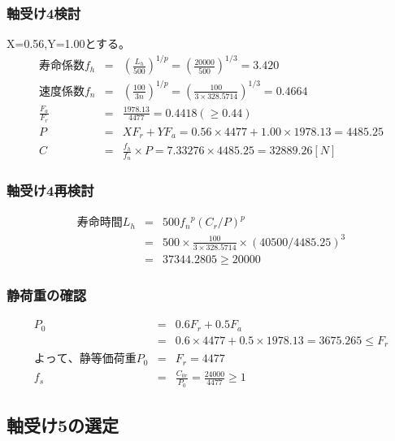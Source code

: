 \documentclass[a4j,twoside,openright,11pt]{jreport}
\begin{document}
\subsubsection{軸受け4検討}
X=0.56,Y=1.00とする。
\begin{eqnarray}
寿命係数f_h &=& \left( \frac{L_h}{500} \right)^{1/p} = \left( \frac{20000}{500} \right)^{1/3} = 3.420\\
速度係数f_n &=& \left( \frac{100}{3n} \right)^{1/p} = \left( \frac{100}{3 \times 328.5714} \right)^{1/3} = 0.4664\\
\frac{F_a}{F_r} &=& \frac{1978.13}{4477} = 0.4418(\geq 0.44)\\
P &=& XF_r+YF_a = 0.56 \times 4477 + 1.00 \times 1978.13 = 4485.25\\
C &=& \frac{f_h}{f_n} \times P = 7.33276 \times 4485.25 = 32889.26[N]
\end{eqnarray}

\subsubsection{軸受け4再検討}
\begin{eqnarray}
寿命時間L_h &=& 500{f_n}^p(C_r/P)^p\\
           &=& 500 \times \frac{100}{3 \times 328.5714} \times (40500/4485.25)^3\\
           &=& 37344.2805 \geq 20000
\end{eqnarray}

\subsubsection{静荷重の確認}
\begin{eqnarray}
P_0&=&0.6F_r+0.5F_a\\
&=&0.6 \times 4477 + 0.5 \times 1978.13 = 3675.265 \leq F_r\\
よって、静等価荷重P_0 &=& F_r = 4477\\
f_s &=& \frac{C_{0r}}{P_0} = \frac{24000}{4477}\geq 1
\end{eqnarray}


\newpage
\subsection{軸受け5の選定}
\end{document}
